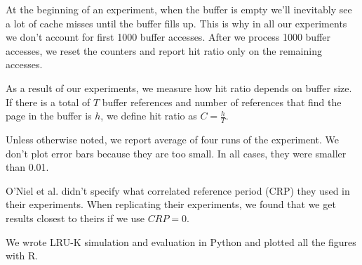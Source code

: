 
At the beginning of an experiment, when the buffer is empty we'll inevitably see a lot of cache misses until the buffer fills up. This is why in all our experiments we don't account for first 1000 buffer accesses. After we process 1000 buffer accesses, we reset the counters and report hit ratio only on the remaining accesses.

As a result of our experiments, we measure how hit ratio depends on buffer size. If there is a total of $T$ buffer references and number of references that find the page in the buffer is $h$, we define hit ratio as $C = \frac{h}{T}$.

Unless otherwise noted, we report average of four runs of the experiment. We don't plot error bars because they are too small. In all cases, they were smaller than 0.01.

O'Niel et al. \cite{lruk} didn't specify what correlated reference period (CRP) they used in their experiments. When replicating their experiments, we found that we get results closest to theirs if we use $CRP = 0$.

We wrote LRU-K simulation and evaluation in Python and plotted all the figures with R.